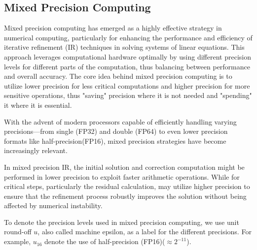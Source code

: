 \subsection{Mixed Precision Computing}
Mixed precision computing has emerged as a highly effective strategy in numerical computing, 
particularly for enhancing the performance and efficiency of iterative refinement (IR) techniques in solving systems of linear equations. 
This approach leverages computational hardware optimally by using different precision levels for different parts of the computation, 
thus balancing between performance and overall accuracy.
The core idea behind mixed precision computing is to utilize lower precision for less critical computations and higher precision for more sensitive operations, 
thus "saving" precision where it is not needed and "spending" it where it is essential.

With the advent of modern processors capable of efficiently handling varying precisions—from single (FP32) and double (FP64) to even lower precision formats like half-precision(FP16), 
mixed precision strategies have become increasingly relevant. 

In mixed precision IR, the initial solution and correction computation might be performed in lower precision to exploit faster arithmetic operations. 
While for critical steps, particularly the residual calculation, may utilize higher precision to ensure that the refinement process robustly improves the solution without being affected by numerical instability.

To denote the precision levels used in mixed precision computing, 
we use unit round-off $u$, also called machine epsilon, as a label for the different precisions. 
For example, $u_{16}$ denote the use of half-precision (FP16)($\approx 2^{-11}$).
\clearpage